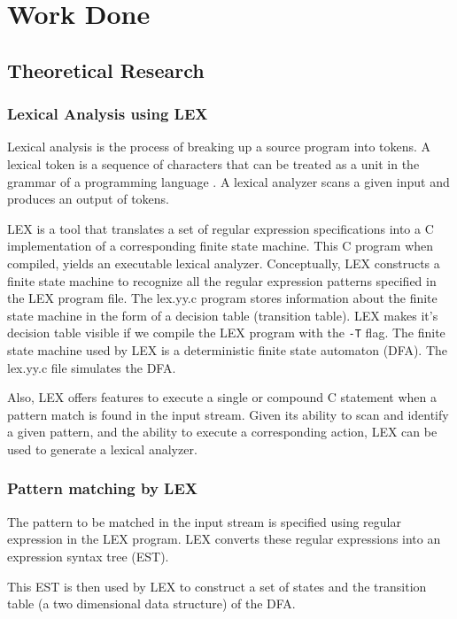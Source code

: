 \chapter{Work Done}

\section{Theoretical Research}

\subsection{Lexical Analysis using LEX}
Lexical analysis is the process of breaking up a source program into tokens. A lexical token is a sequence of characters that can be treated as a unit in the grammar of a programming language \cite{citation-1-name-here}. A lexical analyzer scans a given input and produces an output of tokens.

LEX is a tool that translates a set of regular expression specifications into a C implementation of a corresponding finite state machine. This C program when compiled, yields an executable lexical analyzer. Conceptually, LEX constructs a finite state machine to recognize all the regular expression patterns specified in the LEX program file. The lex.yy.c program stores information about the finite state machine in the form of a decision table (transition table). LEX makes it's decision table visible if we compile the LEX program with the \texttt{-T} flag. The finite state machine used by LEX is a deterministic finite state automaton (DFA). The lex.yy.c file simulates the DFA.

Also, LEX offers features to execute a single or compound C statement when a pattern match is found in the input stream. Given its ability to scan and identify a given pattern, and the ability to execute a corresponding action, LEX can be used to generate a lexical analyzer.
 
\subsection{Pattern matching by LEX}
The pattern to be matched in the input stream is specified using regular expression in the LEX program. LEX converts these regular expressions into an expression syntax tree (EST). 

This EST is then used by LEX to construct a set of states and the transition table (a two dimensional data structure) of the DFA. 

